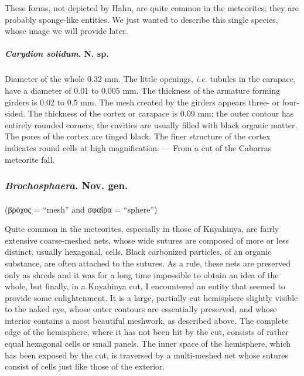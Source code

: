 \documentclass[a4paper, 12pt, oneside]{article}
\begin{document}
These forms, not depicted by Hahn, are quite common in the meteorites; they are probably sponge-like entities. We just wanted to describe this single species, whose image we will provide later.
\paragraph{\emph{Carydion solidum}. N. sp.}
\subparagraph{}
Diameter of the whole 0.32 mm. The little openings, \emph{i.e.} tubules in the carapace, have a diameter of 0.01 to 0.005 mm. The thickness of the armature forming girders is 0.02 to 0.5 mm. The mesh created by the girders appears three- or four-sided. The thickness of the cortex or carapace is 0.09 mm; the outer contour has entirely rounded corners; the cavities are usually filled with black organic matter. The pores of the cortex are tinged black. The finer structure of the cortex indicates round cells at high magnification. --- From a cut of the Cabarras meteorite fall.
\subsubsection{\emph{Brochosphaera}. Nov. gen.}
\paragraph*{}
(βρόχος = ``mesh'' and σφαῖρα = ``sphere'')%

Quite common in the meteorites, especially in those of Knyahinya, are fairly extensive coarse-meshed nets, whose wide sutures are composed of more or less distinct, usually hexagonal, cells. Black carbonized particles, of an organic substance, are often attached to the sutures. As a rule, these nets are preserved only as shreds and it was for a long time impossible to obtain an idea of the whole, but finally, in a Knyahinya cut, I encountered an entity that seemed to provide some enlightenment. It is a large, partially cut hemisphere slightly visible to the naked eye, whose outer contours are essentially preserved, and whose interior contains a most beautiful meshwork, as described above. The complete edge of the hemisphere, where it has not been hit by the cut, consists of rather equal hexagonal cells or small panels. The inner space of the hemisphere, which has been exposed by the cut, is traversed by a multi-meshed net whose sutures consist of cells just like those of the exterior.
\end{document}
